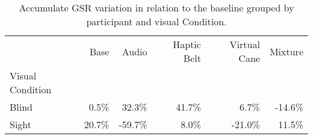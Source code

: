 
\begin{table}[!htb]
\centering
\caption{Accumulate GSR variation in relation to the baseline grouped by participant and visual Condition.}
\label{tab:gsr_var_sum_def}
\begin{tabular}{lrrrrr}
\toprule
{} &    Base &    Audio & Haptic Belt & Virtual Cane &  Mixture \\
Visual Condition &         &          &             &              &          \\
\midrule
Blind            &   0.5\% &   32.3\% &      41.7\% &        6.7\% &  -14.6\% \\
Sight            &  20.7\% &  -59.7\% &       8.0\% &      -21.0\% &   11.5\% \\
\bottomrule
\end{tabular}
\end{table}

